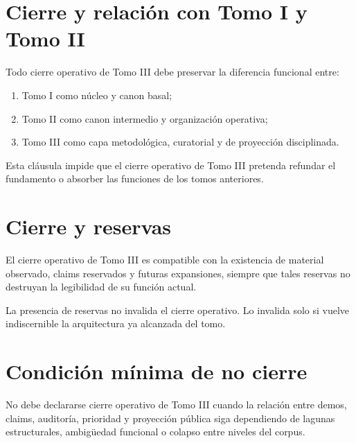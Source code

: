 \section{Cierre y relación con Tomo I y Tomo II}
\begin{definition}
Todo cierre operativo de Tomo III debe preservar la diferencia funcional entre:
\begin{enumerate}
  \item Tomo I como núcleo y canon basal;
  \item Tomo II como canon intermedio y organización operativa;
  \item Tomo III como capa metodológica, curatorial y de proyección disciplinada.
\end{enumerate}
\end{definition}

\begin{observation}
Esta cláusula impide que el cierre operativo de Tomo III pretenda refundar el fundamento o absorber las funciones de los tomos anteriores.
\end{observation}

\section{Cierre y reservas}
\begin{definition}
El cierre operativo de Tomo III es compatible con la existencia de material observado, claims reservados y futuras expansiones, siempre que tales reservas no destruyan la legibilidad de su función actual.
\end{definition}

\begin{observation}
La presencia de reservas no invalida el cierre operativo. Lo invalida solo si vuelve indiscernible la arquitectura ya alcanzada del tomo.
\end{observation}

\section{Condición mínima de no cierre}
\begin{definition}
No debe declararse cierre operativo de Tomo III cuando la relación entre demos, claims, auditoría, prioridad y proyección pública siga dependiendo de lagunas estructurales, ambigüedad funcional o colapso entre niveles del corpus.
\end{definition}

